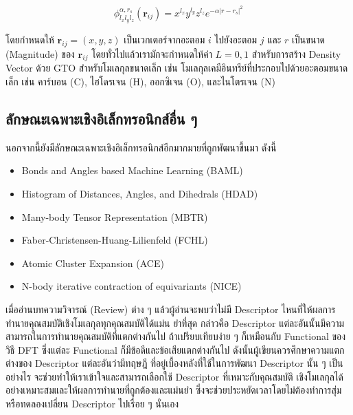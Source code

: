 \begin{equation}\label{eq:gaussian_orb}
    \phi^{\alpha,r_{s}}_{l_{x}l_{y}l_{z}} (\bm{r}_{ij}) = x^{l_{x}}y^{l_{y}}z^{l_{z}} e^{-\alpha 
    |r-r_{s}|^{2}}
\end{equation}

\noindent โดยกำหนดให้ $\bm{r}_{ij} = (x,y,z)$ เป็นเวกเตอร์จากอะตอม $i$ ไปยังอะตอม $j$ และ $r$ เป็นขนาด (Magnitude) 
ของ $\bm{r}_{ij}$ โดยทั่วไปแล้วเรามักจะกำหนดให้ค่า $L=0,1$ สำหรับการสร้าง Density Vector ด้วย GTO สำหรับโมเลกุลขนาดเล็ก 
เช่น โมเลกุลเคมีอินทรีย์ที่ประกอบไปด้วยอะตอมขนาดเล็ก เช่น คาร์บอน (C), ไฮโดรเจน (H), ออกซิเจน (O), และไนโตรเจน (N)

\subsection{ลักษณะเฉพาะเชิงอิเล็กทรอนิกส์อื่น ๆ}
\label{ssec:other_feat_elec}

นอกจากนี้ยังมีลักษณะเฉพาะเชิงอิเล็กทรอนิกส์อีกมากมายที่ถูกพัฒนาขึ้นมา\autocite{faber2018} ดังนี้ 

\begin{itemize}[topsep=0pt]
    \item Bonds and Angles based Machine Learning (BAML)\autocite{huang2016}

    \item Histogram of Distances, Angles, and Dihedrals (HDAD)\autocite{faber2017}

    \item Many-body Tensor Representation (MBTR)\autocite{huo2022,langer2022}
    
    \item Faber-Christensen-Huang-Lilienfeld (FCHL)\autocite{faber2018}
    
    \item Atomic Cluster Expansion (ACE)\autocite{drautz2019,kovacs2021}
    
    \item N-body iterative contraction of equivariants (NICE)\autocite{nigam2020}
\end{itemize}

เมื่ออ่านบทความวิจารณ์ (Review) ต่าง ๆ แล้วผู้อ่านจะพบว่าไม่มี Descriptor ไหนที่ให้ผลการทำนายคุณสมบัติเชิงโมเลกุลทุกคุณสมบัติได้แม่น%
ยำที่สุด กล่าวคือ Descriptor แต่ละอันนั้นมีความสามารถในการทำนายคุณสมบัติที่แตกต่างกันไป ถ้าเปรียบเทียบง่าย ๆ ก็เหมือนกับ Functional 
ของวิธี DFT ซึ่งแต่ละ Functional ก็มีข้อดีและข้อเสียแตกต่างกันไป ดังนั้นผู้เขียนควรศึกษาความแตกต่างของ Descriptor แต่ละอันว่ามีทฤษฎี%
ที่อยู่เบื้องหลังที่ใช้ในการพัฒนา Descriptor นั้น ๆ เป็นอย่างไร จะช่วยทำให้เราเข้าใจและสามารถเลือกใช้ Descriptor ที่เหมาะกับคุณสมบัติ%
เชิงโมเลกุลได้อย่างเหมาะสมและให้ผลการทำนายที่ถูกต้องและแม่นยำ ซึ่งจะช่วยประหยัดเวลาโดยไม่ต้องทำการสุ่มหรือทดลองเปลี่ยน Descriptor 
ไปเรื่อย ๆ นั่นเอง

